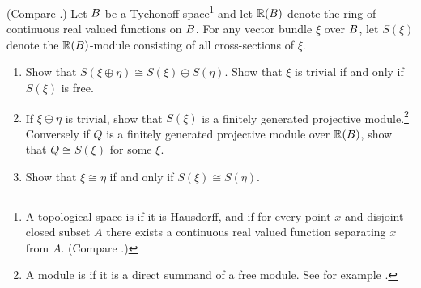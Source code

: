 \documentclass[../main]{subfiles}
\begin{document}
\begin{problem}\label{prob-3-F}
(Compare \cite{Swan1962VectorBA}.) Let $B$ be a Tychonoff space\footnote{A topological space is  if it is Hausdorff, and if for every point $x$ and disjoint closed subset $A$ there exists a continuous real valued function separating $x$ from $A$. (Compare \cite{kelley1955}.)} and let $\mathbb{R}(B)$ denote the ring of continuous real valued functions on $B$. For any vector bundle $\xi$ over $B$, let $S(\xi)$ denote the $\mathbb{R}(B)$-module consisting of all cross-sections of $\xi$.
\begin{enumerate}
    \item Show that $S(\xi\oplus\eta)\cong S(\xi)\oplus S(\eta)$. Show that $\xi$ is trivial if and only if $S(\xi)$ is free.
	\item If $\xi\oplus\eta$ is trivial, show that $S(\xi)$ is a finitely generated projective module.\footnote{A module is  if it is a direct summand of a free module. See for example \cite[p. 368]{maclane1999algebra}.} Conversely if $Q$ is a finitely generated projective module
	over $\mathbb{R}(B)$, show that $Q\cong S(\xi)$ for some $\xi$.
	\item Show that $\xi\cong\eta$ if and only if $S(\xi)\cong S(\eta)$.
\end{enumerate}
\end{problem}
\end{document}
